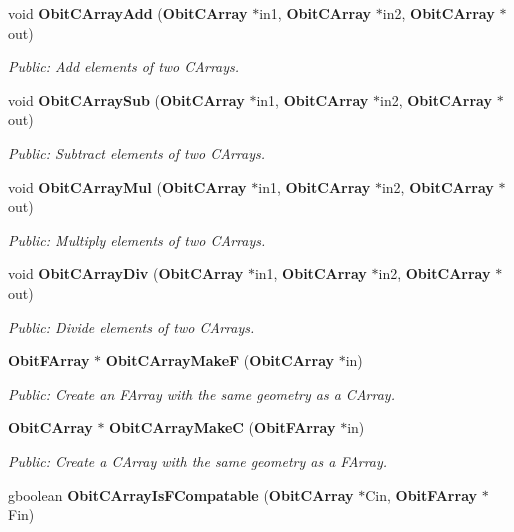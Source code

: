 \begin{CompactItemize}
void {\bf Obit\-CArray\-Add} ({\bf Obit\-CArray} $\ast$in1, {\bf Obit\-CArray} $\ast$in2, {\bf Obit\-CArray} $\ast$out)
\begin{CompactList}\small\item\em Public: Add elements of two CArrays. \item\end{CompactList}\item 
void {\bf Obit\-CArray\-Sub} ({\bf Obit\-CArray} $\ast$in1, {\bf Obit\-CArray} $\ast$in2, {\bf Obit\-CArray} $\ast$out)
\begin{CompactList}\small\item\em Public: Subtract elements of two CArrays. \item\end{CompactList}\item 
void {\bf Obit\-CArray\-Mul} ({\bf Obit\-CArray} $\ast$in1, {\bf Obit\-CArray} $\ast$in2, {\bf Obit\-CArray} $\ast$out)
\begin{CompactList}\small\item\em Public: Multiply elements of two CArrays. \item\end{CompactList}\item 
void {\bf Obit\-CArray\-Div} ({\bf Obit\-CArray} $\ast$in1, {\bf Obit\-CArray} $\ast$in2, {\bf Obit\-CArray} $\ast$out)
\begin{CompactList}\small\item\em Public: Divide elements of two CArrays. \item\end{CompactList}\item 
{\bf Obit\-FArray} $\ast$ {\bf Obit\-CArray\-Make\-F} ({\bf Obit\-CArray} $\ast$in)
\begin{CompactList}\small\item\em Public: Create an FArray with the same geometry as a CArray. \item\end{CompactList}\item 
{\bf Obit\-CArray} $\ast$ {\bf Obit\-CArray\-Make\-C} ({\bf Obit\-FArray} $\ast$in)
\begin{CompactList}\small\item\em Public: Create a CArray with the same geometry as a FArray. \item\end{CompactList}\item 
gboolean {\bf Obit\-CArray\-Is\-FCompatable} ({\bf Obit\-CArray} $\ast$Cin, {\bf Obit\-FArray} $\ast$Fin)

\end{CompactItemize}
